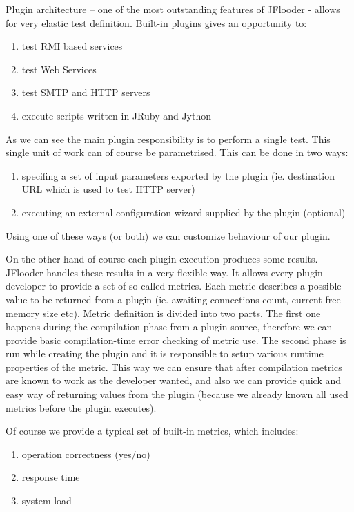 \documentclass{article}
\begin{document}
Plugin architecture – one of the most outstanding features of JFlooder - allows for very elastic test definition. Built-in plugins gives an opportunity to:
\begin{enumerate}
\item{test RMI based services}
\item{test Web Services}
\item{test SMTP and HTTP servers}
\item{execute scripts written in JRuby and Jython}
\end{enumerate}

As we can see the main plugin responsibility is to perform a single test.
This single unit of work can of course be parametrised.
This can be done in two ways:
\begin{enumerate}
\item{specifing a set of input parameters exported by the plugin (ie. destination URL which is used to test HTTP server)}
\item{executing an external configuration wizard supplied by the plugin (optional)}
\end{enumerate}
Using one of these ways (or both) we can customize behaviour of our plugin.

On the other hand of course each plugin execution produces some results.
JFlooder handles these results in a very flexible way.
It allows every plugin developer to provide a set of so-called metrics.
Each metric describes a possible value to be returned from a plugin (ie. awaiting connections count, current free memory size etc).
Metric definition is divided into two parts.
The first one happens during the compilation phase from a plugin source, therefore we can provide basic compilation-time error checking of metric use.
The second phase is run while creating the plugin and it is responsible to setup various runtime properties of the metric.
This way we can ensure that after compilation metrics are known to work as the developer wanted, and also we can provide quick and easy way of returning values from the plugin (because we already known all used metrics before the plugin executes).

Of course we provide a typical set of built-in metrics, which includes:
\begin{enumerate}
\item{operation correctness (yes/no)}
\item{response time}
\item{system load}
\end{enumerate}
\end{document}
